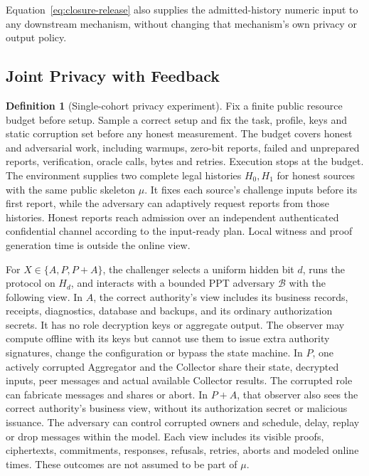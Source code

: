 \documentclass[conference,compsoc]{IEEEtran}
\theoremstyle{definition}
\newtheorem{definition}{Definition}[section]
\newtheorem{definition}{Definition}
\numberwithin{equation}{section}
\numberwithin{table}{section}
\numberwithin{figure}{section}
\theoremstyle{plain}
\begin{document}
\label{lem:dp-input-correctness}
Equation~\eqref{eq:closure-release} also supplies the admitted-history numeric
input to any downstream mechanism, without changing that mechanism's own
privacy or output policy.

\subsection{Joint Privacy with Feedback}
\label{sec:joint-privacy}

\begin{definition}[Single-cohort privacy experiment]
\label{game:privacy}
Fix a finite public resource budget before setup. Sample a correct setup and
fix the task, profile, keys and static corruption set before any honest
measurement. The budget covers honest and
adversarial work, including warmups, zero-bit reports, failed and unprepared
reports, verification, oracle calls, bytes and retries. Execution stops at the
budget. The environment supplies two complete legal histories \(H_0,H_1\) for
honest sources with the same public skeleton \(\mu\). It fixes each source's
challenge inputs before its first report, while the adversary can adaptively
request reports from those histories. Honest reports reach admission over an
independent authenticated confidential channel according to the input-ready
plan. Local witness and proof generation time is outside the online view.

For \(X\in\{A,P,P{+}A\}\), the challenger selects a uniform hidden bit \(d\), runs
the protocol on \(H_d\), and interacts with a bounded PPT adversary
\(\mathcal B\) with the following view. In \(A\),
the correct authority's view includes its business records, receipts,
diagnostics, database and backups, and its ordinary authorization secrets.
It has no role decryption keys or aggregate output. The observer may compute
offline with its keys but cannot use them to issue extra authority signatures,
change the configuration or bypass the state machine. In \(P\), one actively corrupted
Aggregator and the Collector share their state, decrypted inputs, peer
messages and actual available Collector results. The corrupted role can
fabricate messages and shares or abort. In \(P{+}A\), that observer also sees
the correct authority's business view, without its authorization secret or
malicious issuance. The adversary can control corrupted owners and schedule,
delay, replay or drop messages within the model. Each view includes its
visible proofs, ciphertexts, commitments, responses, refusals, retries, aborts
and modeled online times. These outcomes are not assumed to be part of \(\mu\).


\end{definition}
\end{document}
